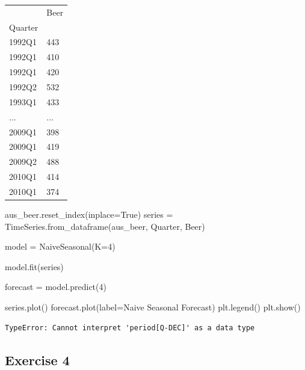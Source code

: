\documentclass[
  11pt,
]{article}
\newenvironment{Shaded}{\begin{snugshade}}{\end{snugshade}}
\newcommand{\DecValTok}[1]{\textcolor[rgb]{0.68,0.00,0.00}{#1}}
\newcommand{\NormalTok}[1]{\textcolor[rgb]{0.00,0.23,0.31}{#1}}
\newcommand{\OperatorTok}[1]{\textcolor[rgb]{0.37,0.37,0.37}{#1}}
\newcommand{\StringTok}[1]{\textcolor[rgb]{0.13,0.47,0.30}{#1}}
\newcommand{\VariableTok}[1]{\textcolor[rgb]{0.07,0.07,0.07}{#1}}
\begin{document}
\begin{longtable}[]{@{}ll@{}}
\toprule\noalign{}
& Beer \\
Quarter & \\
\midrule\noalign{}
\endhead
\bottomrule\noalign{}
\endlastfoot
1992Q1 & 443 \\
1992Q1 & 410 \\
1992Q1 & 420 \\
1992Q2 & 532 \\
1993Q1 & 433 \\
... & ... \\
2009Q1 & 398 \\
2009Q1 & 419 \\
2009Q2 & 488 \\
2010Q1 & 414 \\
2010Q1 & 374 \\
\end{longtable}

\begin{Shaded}
\begin{Highlighting}[]
\NormalTok{aus\_beer.reset\_index(inplace}\OperatorTok{=}\VariableTok{True}\NormalTok{)}
\NormalTok{series }\OperatorTok{=}\NormalTok{ TimeSeries.from\_dataframe(aus\_beer, }\StringTok{\textquotesingle{}Quarter\textquotesingle{}}\NormalTok{, }\StringTok{\textquotesingle{}Beer\textquotesingle{}}\NormalTok{)}

\NormalTok{model }\OperatorTok{=}\NormalTok{ NaiveSeasonal(K}\OperatorTok{=}\DecValTok{4}\NormalTok{)}

\NormalTok{model.fit(series)}

\NormalTok{forecast }\OperatorTok{=}\NormalTok{ model.predict(}\DecValTok{4}\NormalTok{)}

\NormalTok{series.plot()}
\NormalTok{forecast.plot(label}\OperatorTok{=}\StringTok{\textquotesingle{}Naive Seasonal Forecast\textquotesingle{}}\NormalTok{)}
\NormalTok{plt.legend()}
\NormalTok{plt.show()}


\end{Highlighting}
\end{Shaded}

\begin{verbatim}
TypeError: Cannot interpret 'period[Q-DEC]' as a data type
\end{verbatim}

\subsection{Exercise 4}\label{exercise-4}
\end{document}
